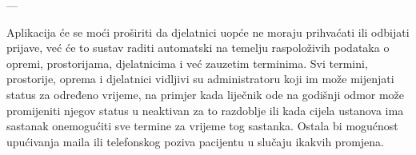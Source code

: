 		---
		
		Aplikacija će se moći proširiti da djelatnici uopće ne moraju prihvaćati ili odbijati prijave, već će to sustav raditi automatski na temelju raspoloživih podataka o opremi, prostorijama, djelatnicima i već zauzetim terminima. Svi termini, prostorije, oprema i djelatnici vidljivi su administratoru koji im može mijenjati status za određeno vrijeme, na primjer kada liječnik ode na godišnji odmor može promijeniti njegov status u neaktivan za to razdoblje ili kada cijela ustanova ima sastanak onemogućiti sve termine za vrijeme tog sastanka. Ostala bi mogućnost upućivanja maila ili telefonskog poziva pacijentu u slučaju ikakvih promjena.
		
	
		\eject
		
				
	
